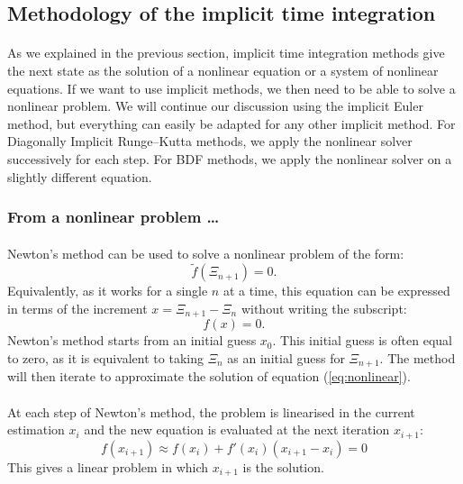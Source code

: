     \subsection{Methodology of the implicit time integration}

      \paragraph{}
      As we explained in the previous section, implicit time integration methods give the next state as the solution of a nonlinear equation or a system of nonlinear equations.
      If we want to use implicit methods, we then need to be able to solve a nonlinear problem.
      We will continue our discussion using the implicit Euler method, but everything can easily be adapted for any other implicit method.
      For Diagonally Implicit Runge--Kutta methods, we apply the nonlinear solver successively for each step.
      For BDF methods, we apply the nonlinear solver on a slightly different equation.


      \subsubsection{From a nonlinear problem \dots}

      	\paragraph{}
      	Newton's method can be used to solve a nonlinear problem of the form:
      	\begin{equation}
      		\tilde{f}\left(\Xi_{n+1}\right) = 0 .
      	\end{equation}
        Equivalently, as it works for a single $n$ at a time, this equation can be expressed in terms of the increment $x = \Xi_{n+1} - \Xi_n$ without writing the subscript:
        \begin{equation}\label{eq:nonlinear}
      		f\left(x\right) = 0 .
      	\end{equation}
        Newton's method starts from an initial guess $x_0$.
        This initial guess is often equal to zero, as it is equivalent to taking $\Xi_n$ as an initial guess for $\Xi_{n+1}$.
        The method will then iterate to approximate the solution of equation (\ref{eq:nonlinear}).

        \paragraph{}
        At each step of Newton's method, the problem is linearised in the current estimation $x_i$ and the new equation is evaluated at the next iteration $x_{i+1}$:
        \begin{equation}\label{eq:nonlinear_linearised}
          f\left(x_{i+1}\right) \approx f\left(x_i\right) + f'\left(x_i\right) \left( x_{i+1} - x_i \right) = 0
        \end{equation}
        This gives a linear problem in which $x_{i+1}$ is the solution.


